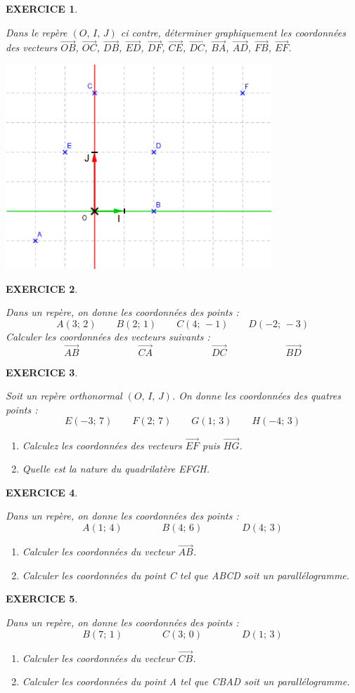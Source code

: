 \documentclass[a4paper]{article}   %
\renewcommand{\(}{\left(}
\renewcommand{\)}{\right)}
\newtheorem{EXO}{\large EXERCICE }
\newenvironment{EX}   { \setcounter{ques}{0} \begin{EXO} \hrulefill ~\vspace{0.3cm}

\normalfont}    {\end{EXO} \medskip}
\def\v{\overrightarrow}	%
\begin{document}
\setcounter{EXO}{0} {\large{
\vfill
\begin{EX} 
Dans le repère $(O,\, I,\,J)$ ci contre, déterminer graphiquement les coordonnées des vecteurs $\v{OB}$, $\v{OC}$, $\v{DB}$, $\v{ED}$, $\v{DF}$, $\v{CE}$, $\v{DC}$, $\v{BA}$, $\v{AD}$, $\v{FB}$, $\v{EF}$.
\begin{center}
\includegraphics[width=10cm]{8tex1.PNG}
\end{center}
\end{EX}
\vfill
\begin{EX} 
Dans un repère, on donne les coordonnées des points :
$$A(3;\,2) \qquad B(2;\,1) \qquad C(4;\,-1) \qquad D(-2;\,-3)$$
Calculer les coordonnées des vecteurs suivants :
$$\v{AB} \qquad \qquad \qquad \v{CA} \qquad \qquad \qquad \v{DC} \qquad \qquad \qquad \v{BD} $$
\end{EX}
\vfill
\begin{EX} 
Soit un repère orthonormal $(O,\,I,\,J)$. On donne les coordonnées des quatres points :
$$E(-3;\,7) \qquad F(2;\,7) \qquad G(1;\,3) \qquad H(-4;\,3)$$
\begin{enumerate}
\item Calculez les coordonnées des vecteurs $\v{EF}$ puis $\v{HG}$.
\item Quelle est la nature du quadrilatère EFGH.
\end{enumerate}
\end{EX}
\vfill
\newpage
\begin{EX} Dans un repère, on donne les coordonnées des points :
$$A(1;\,4) \qquad \qquad B(4;\,6) \qquad \qquad D(4;\,3)$$
\begin{enumerate}
\item Calculer les coordonnées du vecteur $\v{AB}$.
\item  Calculer les coordonnées du point C tel que ABCD soit un parallélogramme.
\end{enumerate}
\end{EX}
\vfill
\begin{EX} Dans un repère, on donne les coordonnées des points :
$$B(7;\,1) \qquad \qquad C(3;\,0) \qquad \qquad D(1;\,3)$$
\begin{enumerate}
\item  Calculer les coordonnées du vecteur $\v{CB}$.
\item Calculer les coordonnées du point A tel que CBAD soit un parallélogramme.
\end{enumerate}


\end{EX}}}
\end{document}
